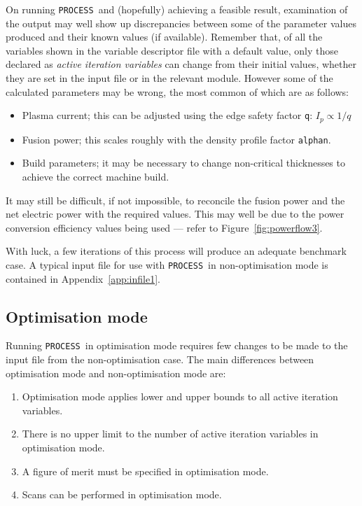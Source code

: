 \documentclass[11pt,a4paper]{report}
\newcommand{\process}{\mbox{\texttt{PROCESS}}}
\begin{document}
On running \process\ and (hopefully) achieving a feasible result, examination
of the output may well show up discrepancies between some of the parameter
values produced and their known values (if available). Remember that, of all
the variables shown in the variable descriptor file with a default value, only
those declared as \textit{active iteration variables}\/ can change from their
initial values, whether they are set in the input file or in the relevant
module. However some of the calculated parameters may be wrong, the most
common of which are as follows:
\begin{itemize}

\item Plasma current; this can be adjusted using the edge safety factor
  \texttt{q}: $I_p \propto 1/q$

\item Fusion power; this scales roughly with the density profile factor
  \texttt{alphan}.

\item Build parameters; it may be necessary to change non-critical thicknesses
  to achieve the correct machine build.

\end{itemize}

It may still be difficult, if not impossible, to reconcile the fusion power
and the net electric power with the required values. This may well be due to
the power conversion efficiency values being used --- refer to
Figure~\ref{fig:powerflow3}.

With luck, a few iterations of this process will produce an adequate benchmark
case. A typical input file for use with \process\ in non-optimisation mode is
contained in Appendix~\ref{app:infile1}.

\subsection{Optimisation mode}
\label{sec:optim}

Running \process\ in optimisation mode requires few changes to be made to the
input file from the non-optimisation case. The main differences between
optimisation mode and non-optimisation mode are:

\begin{enumerate}

\item Optimisation mode applies lower and upper bounds to all active iteration
  variables.

\item There is no upper limit to the number of active iteration variables in
  optimisation mode.

\item A figure of merit must be specified in optimisation mode.

\item Scans can be performed in optimisation mode.

\end{enumerate}
\end{document}
